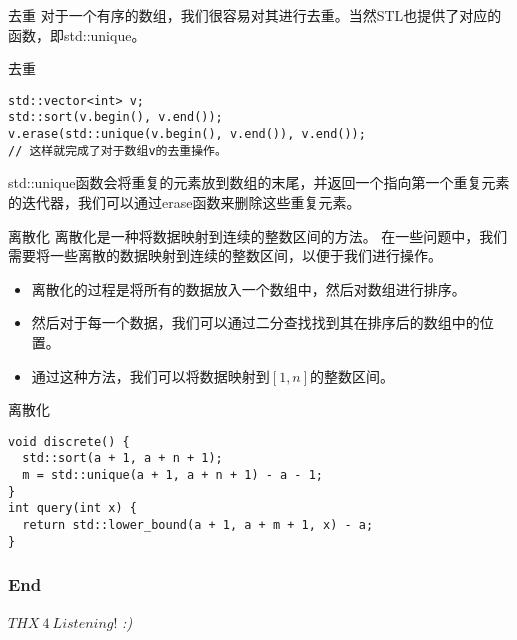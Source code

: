\documentclass{ldr-simple-gray}
\begin{document}
  \begin{frame}[fragile]{去重}
    对于一个有序的数组，我们很容易对其进行去重。当然STL也提供了对应的函数，即std::unique。\\
    \begin{block}{去重}
      \begin{verbatim}
std::vector<int> v;
std::sort(v.begin(), v.end());
v.erase(std::unique(v.begin(), v.end()), v.end());
// 这样就完成了对于数组v的去重操作。\end{verbatim}
    \end{block}
    std::unique函数会将重复的元素放到数组的末尾，并返回一个指向第一个重复元素的迭代器，我们可以通过erase函数来删除这些重复元素。
  \end{frame}

  \begin{frame}{离散化}
    离散化是一种将数据映射到连续的整数区间的方法。
    在一些问题中，我们需要将一些离散的数据映射到连续的整数区间，以便于我们进行操作。
    \begin{itemize}
      \item 离散化的过程是将所有的数据放入一个数组中，然后对数组进行排序。
      \item 然后对于每一个数据，我们可以通过二分查找找到其在排序后的数组中的位置。
      \item 通过这种方法，我们可以将数据映射到$[1,n]$的整数区间。
    \end{itemize}
  \end{frame}

  \begin{frame}[fragile]{离散化}
    \begin{verbatim}
void discrete() {
  std::sort(a + 1, a + n + 1);
  m = std::unique(a + 1, a + n + 1) - a - 1;
}
int query(int x) {
  return std::lower_bound(a + 1, a + m + 1, x) - a;
}
    \end{verbatim}
  \end{frame}

  \begin{frame} %
    \frametitle{End}
    \begin{center}
      \Huge{$THX\ 4\ Listening!$}
      \emph{:)}
    \end{center}
  \end{frame}
\end{document}
